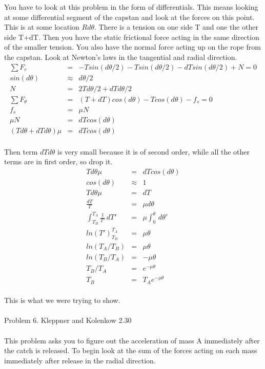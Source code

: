 \documentclass[11pt]{amsart}
\begin{document}
You have to look at this problem in the form of differentials. This means looking at some differential segment of the capstan and look at the forces on this point. This is at some location $Rd\theta$. There is a tension on one side T and one the other side T+dT. Then you have the static frictional force acting in the same direction of the smaller tension. You also have the normal force acting up on the rope from the capstan. Look at Newton's laws in the tangential and radial direction. \\
\begin{eqnarray*}
\sum{F_{r}} &=& -Tsin(d\theta/2)-Tsin(d\theta/2)-dTsin(d\theta/2) +N =0 \\
sin(d\theta) &\approx& d\theta/2 \\
N &=& 2Td\theta/2 +dTd\theta/2 \\
\sum{F_{\theta}} &=& (T+dT)cos(d\theta)-Tcos(d\theta) -f_{s} =0 \\
f_{s} &=& \mu{N} \\
\mu{N} &=& dTcos(d\theta) \\
(Td\theta +dTd\theta)\mu &=& dTcos(d\theta)
\end{eqnarray*} \\
Then term $dTd\theta$ is very small because it is of second order, while all the other terms are in first order, so drop it. \\ 
\begin{eqnarray*} 
Td\theta\mu &=& dTcos(d\theta) \\
cos(d\theta) &\approx& 1 \\
Td\theta\mu &=& dT \\
\frac{dT}{T} &=& \mu{d\theta} \\
\int_{T_{B}}^{T_{A}}\frac{1}{T'}\,dT' &=& \mu\int_{0}^{\theta}\,d\theta' \\
ln(T')_{T_{B}}^{T_{A}} &=& \mu\theta \\
ln(T_{A}/T_{B}) &=& \mu\theta \\
ln(T_{B}/T_{A}) &=& -\mu\theta \\
T_{B}/T_{A} &=& e^{-\mu\theta} \\
T_{B} &=& T_{A}e^{-\mu\theta} 
\end{eqnarray*} \\
This is what we were trying to show. \\ \\
Problem 6. Kleppner and Kolenkow 2.30 \\ \\
This problem asks you to figure out the acceleration of mass A immediately after the catch is released. To begin look at the sum of the forces acting on each mass immediately after release in the radial direction. \\
\end{document}
